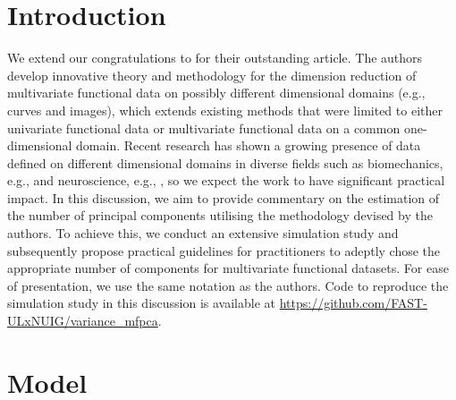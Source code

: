 
\section{Introduction} %
\label{sec:introduction}

We extend our congratulations to \cite{happMultivariateFunctionalPrincipal2018} for their outstanding article. The authors develop innovative theory and methodology for the dimension reduction of multivariate functional data on possibly different dimensional domains (e.g., curves and images), which extends existing methods that were limited to either univariate functional data or multivariate functional data on a common one-dimensional domain. Recent research has shown a growing presence of data defined on different dimensional domains in diverse fields such as biomechanics, e.g., \cite{warmenhovenBivariateFunctionalPrincipal2019} and neuroscience, e.g., \cite{songSparseMultivariateFunctional2022}, so we expect the work to have significant practical impact. In this discussion, we aim to provide commentary on the estimation of the number of principal components utilising the methodology devised by the authors. To achieve this, we conduct an extensive simulation study and subsequently propose practical guidelines for practitioners to adeptly chose the appropriate number of components for multivariate functional datasets. For ease of presentation, we use the same notation as the authors. Code to reproduce the simulation study in this discussion is available at \url{https://github.com/FAST-ULxNUIG/variance_mfpca}.


\section{Model} %
\label{sec:model}

